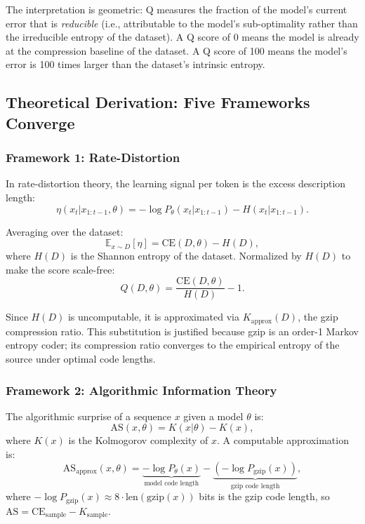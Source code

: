 \documentclass{article}
\begin{document}
The interpretation is geometric: Q measures the fraction of the model's current error that is \emph{reducible} (i.e., attributable to the model's sub-optimality rather than the irreducible entropy of the dataset). A Q score of 0 means the model is already at the compression baseline of the dataset. A Q score of 100 means the model's error is 100 times larger than the dataset's intrinsic entropy.

\subsection{Theoretical Derivation: Five Frameworks Converge}

\subsubsection{Framework 1: Rate-Distortion}

In rate-distortion theory, the learning signal per token is the excess description length:
\begin{equation}
  \eta(x_t | x_{1:t-1}, \theta) = -\log P_\theta(x_t | x_{1:t-1}) - H(x_t | x_{1:t-1}).
\end{equation}

Averaging over the dataset:
\begin{equation}
  \mathbb{E}_{x \sim D}[\eta] = \mathrm{CE}(D, \theta) - H(D),
\end{equation}
where $H(D)$ is the Shannon entropy of the dataset. Normalized by $H(D)$ to make the score scale-free:
\begin{equation}
  Q(D, \theta) = \frac{\mathrm{CE}(D, \theta)}{H(D)} - 1.
\end{equation}

Since $H(D)$ is uncomputable, it is approximated via $K_{\mathrm{approx}}(D)$, the gzip compression ratio. This substitution is justified because gzip is an order-1 Markov entropy coder; its compression ratio converges to the empirical entropy of the source under optimal code lengths.

\subsubsection{Framework 2: Algorithmic Information Theory}

The algorithmic surprise of a sequence $x$ given a model $\theta$ is:
\begin{equation}
  \mathrm{AS}(x, \theta) = K(x | \theta) - K(x),
\end{equation}
where $K(x)$ is the Kolmogorov complexity of $x$. A computable approximation is:
\begin{equation}
  \mathrm{AS}_{\mathrm{approx}}(x, \theta) = \underbrace{-\log P_\theta(x)}_{\text{model code length}} - \underbrace{(-\log P_{\mathrm{gzip}}(x))}_{\text{gzip code length}},
\end{equation}
where $-\log P_{\mathrm{gzip}}(x) \approx 8 \cdot \mathrm{len}(\mathrm{gzip}(x))$ bits is the gzip code length, so $\mathrm{AS} = \mathrm{CE}_{\text{sample}} - K_{\text{sample}}$.
\end{document}
